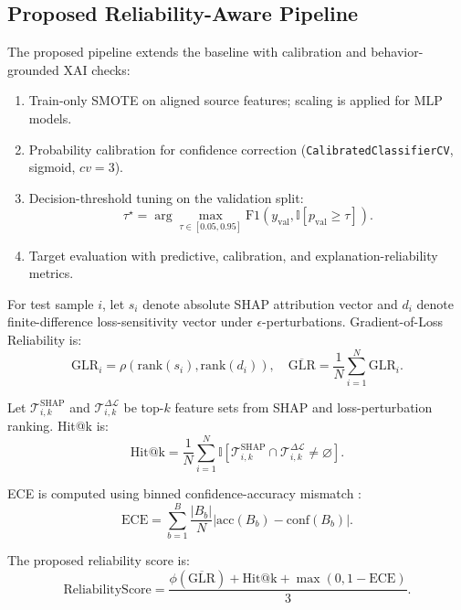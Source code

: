 \documentclass[conference]{IEEEtran}
\begin{document}
\subsection{Proposed Reliability-Aware Pipeline}
The proposed pipeline extends the baseline with calibration and behavior-grounded XAI checks:
\begin{enumerate}
\item Train-only SMOTE on aligned source features; scaling is applied for MLP models.
\item Probability calibration for confidence correction (\texttt{CalibratedClassifierCV}, sigmoid, \(cv=3\)).
\item Decision-threshold tuning on the validation split:
\begin{equation}
\tau^\star=\arg\max_{\tau\in[0.05,0.95]} \text{F1}\!\left(y_{\text{val}}, \mathbb{I}[p_{\text{val}}\ge\tau]\right).
\label{eq:tau_tune}
\end{equation}
\item Target evaluation with predictive, calibration, and explanation-reliability metrics.
\end{enumerate}

For test sample \(i\), let \(s_i\) denote absolute SHAP attribution vector and \(d_i\) denote finite-difference loss-sensitivity vector under \(\epsilon\)-perturbations. Gradient-of-Loss Reliability is:
\begin{equation}
\text{GLR}_i=\rho\!\left(\mathrm{rank}(s_i),\mathrm{rank}(d_i)\right),\quad
\overline{\text{GLR}}=\frac{1}{N}\sum_{i=1}^{N}\text{GLR}_i.
\end{equation}

Let \(\mathcal{T}^{\text{SHAP}}_{i,k}\) and \(\mathcal{T}^{\Delta\mathcal{L}}_{i,k}\) be top-\(k\) feature sets from SHAP and loss-perturbation ranking. Hit@k is:
\begin{equation}
\text{Hit@k}=\frac{1}{N}\sum_{i=1}^{N}\mathbb{I}\!\left[\mathcal{T}^{\text{SHAP}}_{i,k}\cap \mathcal{T}^{\Delta\mathcal{L}}_{i,k}\neq\varnothing\right].
\end{equation}

ECE is computed using binned confidence-accuracy mismatch \cite{r12,r13,r14}:
\begin{equation}
\text{ECE}=\sum_{b=1}^{B}\frac{|B_b|}{N}\left|\text{acc}(B_b)-\text{conf}(B_b)\right|.
\label{eq:ece}
\end{equation}

The proposed reliability score is:
\begin{equation}
\text{ReliabilityScore}=\frac{\phi(\overline{\text{GLR}})+\text{Hit@k}+\max(0,1-\text{ECE})}{3}.
\label{eq:proposed_rs}
\end{equation}
\end{document}
